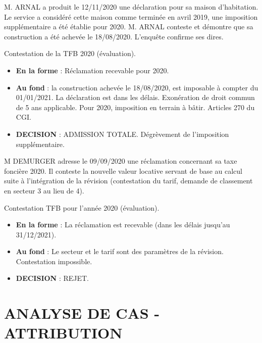 \documentclass[a4paper, 12pt]{exam}
\begin{document}
\begin{questions}
	\question M. ARNAL a produit le 12/11/2020 une déclaration pour sa maison d'habitation. Le service a considéré cette maison comme terminée en avril 2019, une imposition supplémentaire a été établie pour 2020. M. ARNAL conteste et démontre que sa construction a été achevée le 18/08/2020. L'enquête confirme ses dires.
	\begin{solution}
		Contestation de la TFB 2020 (évaluation).
		\begin{itemize}
			\item \textbf{En la forme} : Réclamation recevable pour 2020.
			\item \textbf{Au fond} : la construction achevée le 18/08/2020, est imposable à compter du 01/01/2021. La déclaration est dans les délais. Exonération de droit commun de 5 ans applicable. Pour 2020, imposition en terrain à bâtir. Articles 270 du CGI.
			\item \textbf{DECISION} : ADMISSION TOTALE. Dégrèvement de l'imposition supplémentaire.
		\end{itemize}
	\end{solution}
	
	\question M DEMURGER adresse le 09/09/2020 une réclamation concernant sa taxe foncière 2020. Il conteste la nouvelle valeur locative servant de base au calcul suite à l'intégration de la révision (contestation du tarif, demande de classement en secteur 3 au lieu de 4).
	\begin{solution}
		Contestation TFB pour l'année 2020 (évaluation).
		\begin{itemize}
			\item \textbf{En la forme} : La réclamation est recevable (dans les délais jusqu'au 31/12/2021).
			\item \textbf{Au fond} : Le secteur et le tarif sont des paramètres de la révision. Contestation impossible.
			\item \textbf{DECISION} : REJET.
		\end{itemize}
	\end{solution}
	
\end{questions}



\section*{ANALYSE DE CAS  - ATTRIBUTION}
\end{document}
